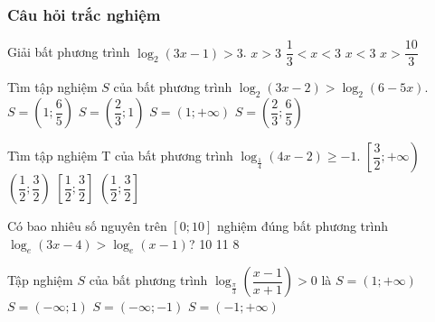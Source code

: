 \subsubsection{Câu hỏi trắc nghiệm}
\begin{ex}%
	Giải bất phương trình $\log_2(3x-1)>3$. 
	\choice
	{\True $x>3$}
	{$\dfrac{1}{3}<x<3$}
	{$x<3$}
	{$x>\dfrac{10}{3}$}
\end{ex}
\begin{ex}%
	Tìm tập nghiệm $S$ của bất phương trình $\log_2(3x-2)>\log_2(6-5x)$. 
	\choice
	{\True $S=\left(1;\dfrac{6}{5}\right)$}
	{$S=\left(\dfrac{2}{3};1\right)$}
	{$S=(1;+\infty)$}
	{$S=\left(\dfrac{2}{3};\dfrac{6}{5}\right)$}
\end{ex}
\begin{ex}%
	Tìm tập nghiệm T của bất phương trình $\log_{\tfrac{1}{4}}(4x-2)\geq-1$. 
	\choice
	{$\left[\dfrac{3}{2};+\infty\right)$}
	{$\left(\dfrac{1}{2};\dfrac{3}{2}\right)$}
	{$\left[\dfrac{1}{2};\dfrac{3}{2}\right]$}
	{\True $\left(\dfrac{1}{2};\dfrac{3}{2}\right]$}
	\loigiai{
		Bất phương trình tương đương $0<4x-2\leq\left(\dfrac{1}{4}\right)^{-1}\Leftrightarrow\dfrac{1}{2}<x\leq\dfrac{3}{2}$.\\
		Vậy tập nghiệm là $T=\left(\dfrac{1}{2};\dfrac{3}{2}\right]$.}
\end{ex}
\begin{ex}%
	Có bao nhiêu số nguyên trên $[0;10]$ nghiệm đúng bất phương trình ${\log_e(3x-4)>\log_e(x-1)}$?
	\choice
	{10}
	{11}
	{}
	{8}
\end{ex}
\begin{ex}%
	Tập nghiệm $S$ của bất phương trình $\log_{\tfrac{\pi}{3}}\left(\dfrac{x-1}{x+1}\right)>0$ là
	\choice
	{$S=(1;+\infty)$}
	{$S=(-\infty;1)$}
	{\True $S=(-\infty;-1)$}
	{$S=(-1;+\infty)$}
\end{ex}
